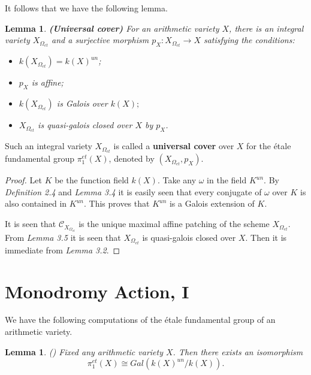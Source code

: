 \documentclass[12pt,twoside,reqno]{amsart}
\newtheorem{lemma}[theorem]{Lemma}
\theoremstyle{definition}
\numberwithin{equation}{section}
\begin{document}
It follows that we have the following lemma.

\begin{lemma}
\emph{\textbf{(Universal cover)}}
For an arithmetic variety $X$, there is an integral variety $X_{\Omega
_{et}}$ and a surjective morphism $p_{X}:X_{\Omega _{et}}\rightarrow X$
satisfying the conditions:

\begin{itemize}
\item $k\left( X_{\Omega _{et}}\right) ={k(X)}^{un}$;

\item $p_{X}$ is affine;

\item $k\left( X_{\Omega _{et}}\right) $ is Galois over $k\left( X\right) ;$

\item $X_{\Omega _{et}}$ is quasi-galois closed over $X$ by $p_{X}$.
\end{itemize}
\end{lemma}

Such an integral variety $X_{\Omega _{et}}$ is called a \textbf{universal
cover} over $X$ for the \'{e}tale fundamental group $\pi _{1}^{et}\left( X\right) $, denoted by $
\left( X_{\Omega _{et}},p_{X}\right) .$

\begin{proof}
Let $K$ be the function field $k(X)$. Take any $\omega$ in the field $K^{un}$. By \emph{Definition 2.4} and \emph{Lemma 3.4} it is easily seen that every conjugate of $\omega$ over $K$ is also contained in $K^{un}$. This proves that $K^{un}$ is a Galois extension of $K$.

It is seen that $\mathcal{C}_{X_{\Omega_{et}}}$ is the unique maximal affine patching of the scheme $X_{\Omega _{et}}$. From \emph{Lemma 3.5} it is seen that $X_{\Omega _{et}}$ is quasi-galois closed over $X$.
Then it is immediate from  \emph{Lemma 3.2}.
\end{proof}



\section{Monodromy Action, I}

We have the following computations of the \'{e}tale fundamental group of an arithmetic variety.

\begin{lemma}
\emph{(\cite{An4*})}
Fixed any arithmetic variety $X$. Then there exists an isomorphism
$$
\pi _{1}^{et}\left( X\right) \cong Gal\left( {k(X)}^{un}/k\left( X\right)
\right).
$$
\end{lemma}
\end{document}
